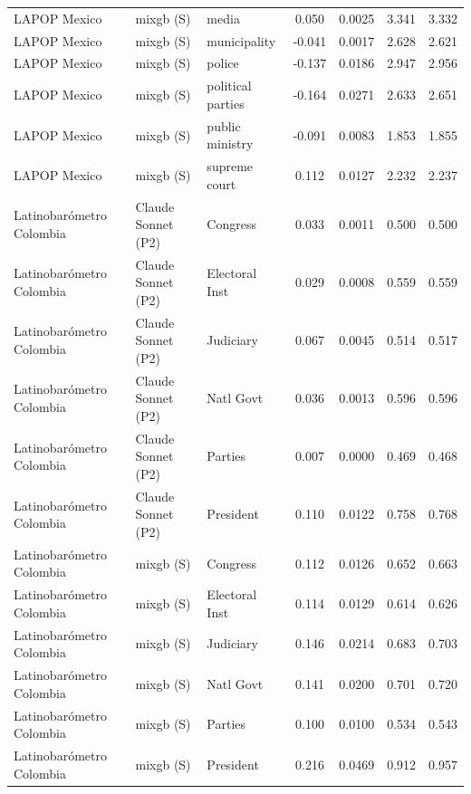 \documentclass[
  man,
  floatsintext,
  longtable,
  nolmodern,
  notxfonts,
  notimes,
  colorlinks=true,linkcolor=blue,citecolor=blue,urlcolor=blue]{apa7}
\begin{document}
\begin{table}
{\begin{tabular}{lllcccc}
LAPOP Mexico & mixgb (S) & media & 0.050 & 0.0025 & 3.341 & 3.332\\
LAPOP Mexico & mixgb (S) & municipality & -0.041 & 0.0017 & 2.628 & 2.621\\
LAPOP Mexico & mixgb (S) & police & -0.137 & 0.0186 & 2.947 & 2.956\\
LAPOP Mexico & mixgb (S) & political parties & -0.164 & 0.0271 & 2.633 & 2.651\\
LAPOP Mexico & mixgb (S) & public ministry & -0.091 & 0.0083 & 1.853 & 1.855\\
LAPOP Mexico & mixgb (S) & supreme court & 0.112 & 0.0127 & 2.232 & 2.237\\
Latinobarómetro Colombia & Claude Sonnet (P2) & Congress & 0.033 & 0.0011 & 0.500 & 0.500\\
Latinobarómetro Colombia & Claude Sonnet (P2) & Electoral Inst & 0.029 & 0.0008 & 0.559 & 0.559\\
Latinobarómetro Colombia & Claude Sonnet (P2) & Judiciary & 0.067 & 0.0045 & 0.514 & 0.517\\
Latinobarómetro Colombia & Claude Sonnet (P2) & Natl Govt & 0.036 & 0.0013 & 0.596 & 0.596\\
Latinobarómetro Colombia & Claude Sonnet (P2) & Parties & 0.007 & 0.0000 & 0.469 & 0.468\\
Latinobarómetro Colombia & Claude Sonnet (P2) & President & 0.110 & 0.0122 & 0.758 & 0.768\\
Latinobarómetro Colombia & mixgb (S) & Congress & 0.112 & 0.0126 & 0.652 & 0.663\\
Latinobarómetro Colombia & mixgb (S) & Electoral Inst & 0.114 & 0.0129 & 0.614 & 0.626\\
Latinobarómetro Colombia & mixgb (S) & Judiciary & 0.146 & 0.0214 & 0.683 & 0.703\\
Latinobarómetro Colombia & mixgb (S) & Natl Govt & 0.141 & 0.0200 & 0.701 & 0.720\\
Latinobarómetro Colombia & mixgb (S) & Parties & 0.100 & 0.0100 & 0.534 & 0.543\\
Latinobarómetro Colombia & mixgb (S) & President & 0.216 & 0.0469 & 0.912 & 0.957\\
\bottomrule
\end{tabular}}
\endgroup{}
\end{table}
\end{document}
